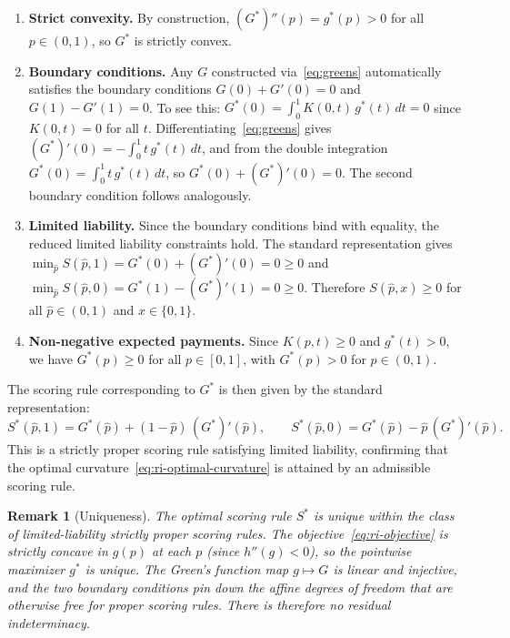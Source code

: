 \documentclass[11pt]{article}
\newtheorem{remark}{Remark}
\begin{document}
\begin{enumerate}
\item \textbf{Strict convexity.} By construction, $(G^*)''(p) = g^*(p) > 0$ for all $p \in (0,1)$, so $G^*$ is strictly convex.

\item \textbf{Boundary conditions.} Any $G$ constructed via~\eqref{eq:greens} automatically satisfies the boundary conditions $G(0) + G'(0) = 0$ and $G(1) - G'(1) = 0$. To see this: $G^*(0) = \int_0^1 K(0,t)\,g^*(t)\,dt = 0$ since $K(0,t) = 0$ for all $t$. Differentiating~\eqref{eq:greens} gives $(G^*)'(0) = -\int_0^1 t\,g^*(t)\,dt$, and from the double integration $G^*(0) = \int_0^1 t\,g^*(t)\,dt$, so $G^*(0) + (G^*)'(0) = 0$. The second boundary condition follows analogously.

\item \textbf{Limited liability.} Since the boundary conditions bind with equality, the reduced limited liability constraints hold. The standard representation gives $\min_{\hat{p}} S(\hat{p},1) = G^*(0) + (G^*)'(0) = 0 \geq 0$ and $\min_{\hat{p}} S(\hat{p},0) = G^*(1) - (G^*)'(1) = 0 \geq 0$. Therefore $S(\hat{p},x) \geq 0$ for all $\hat{p} \in (0,1)$ and $x \in \{0,1\}$.

\item \textbf{Non-negative expected payments.} Since $K(p,t) \geq 0$ and $g^*(t) > 0$, we have $G^*(p) \geq 0$ for all $p \in [0,1]$, with $G^*(p) > 0$ for $p \in (0,1)$.
\end{enumerate}

The scoring rule corresponding to $G^*$ is then given by the standard representation:
\[
S^*(\hat{p},1) = G^*(\hat{p}) + (1-\hat{p})\,(G^*)'(\hat{p}), \qquad S^*(\hat{p},0) = G^*(\hat{p}) - \hat{p}\,(G^*)'(\hat{p}).
\]
This is a strictly proper scoring rule satisfying limited liability, confirming that the optimal curvature~\eqref{eq:ri-optimal-curvature} is attained by an admissible scoring rule.

\begin{remark}[Uniqueness]\label{rem:uniqueness}
The optimal scoring rule $S^*$ is unique within the class of limited-liability strictly proper scoring rules. The objective~\eqref{eq:ri-objective} is strictly concave in $g(p)$ at each $p$ (since $h''(g) < 0$), so the pointwise maximizer $g^*$ is unique. The Green's function map $g \mapsto G$ is linear and injective, and the two boundary conditions pin down the affine degrees of freedom that are otherwise free for proper scoring rules. There is therefore no residual indeterminacy.
\end{remark}
\end{document}

